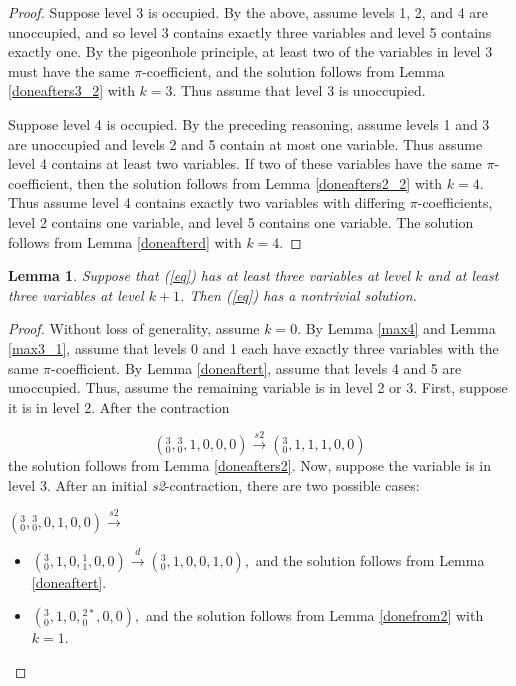 \documentclass{article}
\newtheorem{lemma}{Lemma}
\begin{document}
\begin{proof}
Suppose level 3 is occupied.  By the above, assume levels 1, 2, and 4 are unoccupied, and so level 3 contains exactly three variables and level 5 contains exactly one.  By the pigeonhole principle, at least two of the variables in level 3 must have the same $\pi$-coefficient, and the solution follows from Lemma \ref{doneafters3_2} with $k=3$.  Thus assume that level 3 is unoccupied.

Suppose level 4 is occupied.  By the preceding reasoning, assume levels 1 and 3 are unoccupied and levels 2 and 5 contain at most one variable.  Thus assume level 4 contains at least two variables.  If two of these variables have the same $\pi$-coefficient, then the solution follows from Lemma \ref{doneafters2_2} with $k=4$.  Thus assume level 4 contains exactly two variables with differing $\pi$-coefficients, level 2 contains one variable, and level 5 contains one variable.  The solution follows from Lemma \ref{doneafterd} with $k=4$.
\end{proof}

\begin{lemma}\label{33}
Suppose that (\ref{eq}) has at least three variables at level $k$ and at least three variables at level $k+1$.  Then (\ref{eq}) has a nontrivial solution.
\end{lemma}
\begin{proof}
Without loss of generality, assume $k=0$.  By Lemma \ref{max4} and Lemma \ref{max3_1}, assume that levels 0 and 1 each have exactly three variables with the same $\pi$-coefficient.  By Lemma \ref{doneaftert}, assume that levels 4 and 5 are unoccupied.  Thus, assume the remaining variable is in level 2 or 3.  First, suppose it is in level 2.  After the contraction

$$({}^{3}_{0},{}^{3}_{0},1,0,0,0) \xrightarrow{s2} ({}^{3}_{0},1,1,1,0,0)$$
the solution follows from Lemma \ref{doneafters2}.  Now, suppose the variable is in level 3.  After an initial \textit{s2}-contraction, there are two possible cases:

$({}^{3}_{0},{}^{3}_{0},0,1,0,0) \xrightarrow{s2}$

\begin{itemize}
    \item $({}^{3}_{0},1,0,{}^{1}_{1},0,0) \xrightarrow{d} ({}^{3}_{0},1,0,0,1,0),$
    and the solution follows from Lemma \ref{doneaftert}.
    \item $({}^{3}_{0},1,0,{}^{2*}_{0},0,0),$
    and the solution follows from Lemma \ref{donefrom2} with $k=1$.
\end{itemize}

\end{proof}
\end{document}
